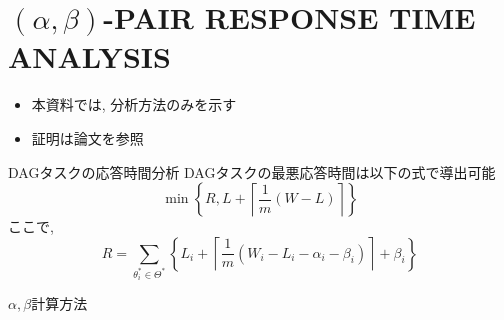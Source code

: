 
\section{$(\alpha, \beta)$-PAIR RESPONSE TIME ANALYSIS}
\label{sec: RESPONSE TIME ANALYSIS}

\begin{frame}{}
    \begin{itemize}
        \item 本資料では, 分析方法のみを示す
        \item 証明は論文を参照
    \end{itemize}
\end{frame}

\begin{frame}{DAGタスクの応答時間分析}
    DAGタスクの最悪応答時間は以下の式で導出可能
    \[
        \min \left\{R, L+\left\lceil\frac{1}{m}(W-L)\right\rceil\right\}
    \]
    ここで,
    \begin{equation*}
        R=\sum_{\theta_{i}^{*} \in \Theta^{*}}\left\{L_{i}+\left\lceil\frac{1}{m}\left(W_{i}-L_{i}-\alpha_{i}-\beta_{i}\right)\right\rceil+\beta_{i}\right\}
    \end{equation*}
\end{frame}

\begin{frame}{$\alpha, \beta$計算方法}
\end{frame}



